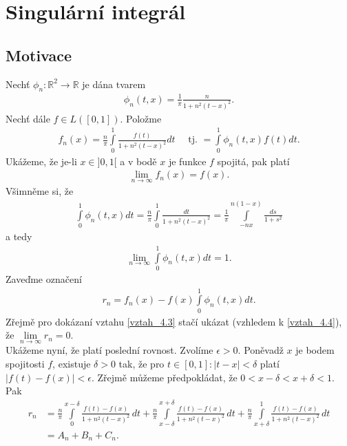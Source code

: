 

\chapter{Singulární integrál}


\section{Motivace}

Nechť $\phi_n : \mathbb{R}^2 \rightarrow \mathbb{R}$ je dána tvarem
\begin{align}\label{vztah_4.1}
\phi_n (t, x) = \frac{1}{\pi} \frac{n}{1+n^2(t-x)^2}.
\end{align}
Nechť dále $f \in L([0,1])$. Položme
\begin{align}\label{vztah_4.2}
f_n (x) = \frac{n}{\pi} \int \limits_0^1 \frac{f(t)}{1+n^2(t-x)^2} dt \quad \textrm{ tj. } = \int \limits_0^1 \phi_n (t,x) f(t) dt.
\end{align}
Ukážeme, že je-li $x \in ]0,1[$ a v bodě $x$ je funkce $f$ spojitá, pak platí
\begin{align}\label{vztah_4.3}
\lim_{n \rightarrow \infty} f_n (x) = f(x).
\end{align}
Všimněme si, že
\begin{align*}
\int \limits_0^1 \phi_n (t,x) dt = \frac{n}{\pi} \int \limits_0^1 \frac{dt}{1+n^2(t-x)^2} = \frac{1}{\pi} \int \limits_{-nx}^{n(1-x)} \frac{ds}{1+s^2}
\end{align*}
a tedy
\begin{align}\label{vztah_4.4}
\lim_{n \rightarrow \infty} \int \limits_0^1 \phi_n (t,x) dt = 1.
\end{align}
Zaveďme označení
\begin{align*}
r_n = f_n (x) - f (x) \int \limits_0^1 \phi_n (t,x) dt.
\end{align*}
Zřejmě pro dokázaní vztahu \eqref{vztah_4.3} stačí ukázat (vzhledem k \eqref{vztah_4.4}), že $\lim \limits _{n \rightarrow \infty} r_n = 0$.\\
Ukážeme nyní, že platí poslední rovnost. Zvolíme $\epsilon > 0$. Poněvadž $x$ je bodem spojitosti $f$, existuje $\delta > 0$ tak, že pro $t \in [0,1] : |t - x| < \delta$ platí $|f(t) - f(x)| < \epsilon$. Zřejmě můžeme předpokládat, že $0 < x- \delta < x + \delta < 1$. Pak
\begin{align*}
r_n &= \frac{n}{\pi} \int \limits_0^{x-\delta} \frac{f(t) - f(x)}{1 +  n^2 (t-x)^2} \, dt + \frac{n}{\pi} \int \limits_{x-\delta}^{x+\delta} \frac{f(t) - f(x)}{1 +  n^2 (t-x)^2} \, dt + \frac{n}{\pi} \int \limits_{x+\delta}^1 \frac{f(t) - f(x)}{1 +  n^2 (t-x)^2} \, dt \\
&= A_n + B_n + C_n.
\end{align*}

